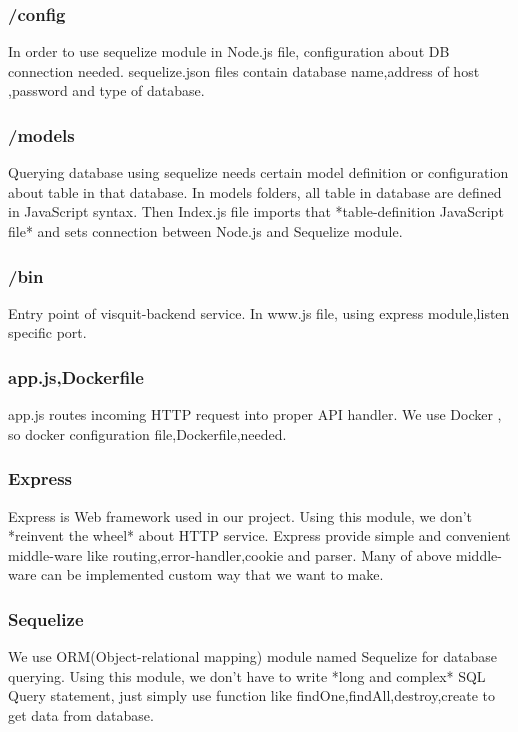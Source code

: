 \documentclass[conference,compsoc]{IEEEtran}
\begin{document}
\subsubsection{/config}
In order to use sequelize module in Node.js file, configuration about DB connection needed. sequelize.json files contain database name,address of host ,password and type of database.

\subsubsection{/models}
Querying database using sequelize needs certain model definition or configuration about table in that database. In models folders, all table in database are defined in JavaScript syntax. Then Index.js file imports that *table-definition JavaScript file* and sets connection between Node.js and Sequelize module.

\subsubsection{/bin}
Entry point of visquit-backend service. In www.js file, using express module,listen specific port.

\subsubsection{app.js,Dockerfile}
app.js routes incoming HTTP request into proper API handler. We use Docker , so docker configuration file,Dockerfile,needed.

\subsubsection{Express}
Express is Web framework used in our project. Using this module, we don't *reinvent the wheel* about HTTP service. Express provide simple and convenient middle-ware like routing,error-handler,cookie and parser. Many of above middle-ware can be implemented custom way that we want to make.

\subsubsection{Sequelize}
We use ORM(Object-relational mapping) module named Sequelize for database querying. Using this module, we don't have to write *long and complex* SQL Query statement, just simply use function like findOne,findAll,destroy,create to get data from database.
\end{document}
